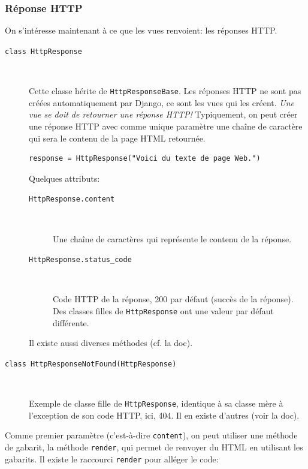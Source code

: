 \documentclass[a4paper, 10pt]{article}
\begin{document}
{\subsubsection{Réponse HTTP}
On  s'intéresse maintenant à ce que les vues renvoient: les réponses HTTP.

\begin{description}
    \item[\texttt{class HttpResponse}]~

    Cette classe hérite de \texttt{HttpResponseBase}. Les réponses HTTP ne sont pas créées automatiquement par Django, ce sont les vues qui les créent. \emph{Une vue se doit de retourner une réponse HTTP!} Typiquement, on peut créer une réponse HTTP avec comme unique paramètre une chaîne de caractère qui sera le contenu de la page HTML retournée.

    \begin{verbatim}
response = HttpResponse("Voici du texte de page Web.")
    \end{verbatim}

    Quelques attributs:

    \begin{description}
        \item[\texttt{HttpResponse.content}]~

        Une chaîne de caractères qui représente le contenu de la réponse.

        \item[\texttt{HttpResponse.status_code}]~

        Code HTTP de la réponse, 200 par défaut (succès de la réponse). Des classes filles de \texttt{HttpResponse} ont une valeur par défaut différente.
    \end{description}

    Il existe aussi diverses méthodes (cf. la doc).

    \item[\texttt{class HttpResponseNotFound(HttpResponse)}]~

    Exemple de classe fille de \texttt{HttpResponse}, identique à sa classe mère à l'exception de son code HTTP, ici, 404. Il en existe d'autres (voir la doc).
\end{description}

Comme  premier paramètre (c'est-à-dire \texttt{content}), on peut utiliser une méthode de gabarit, la méthode \texttt{render}, qui permet de renvoyer du HTML en utilisant les gabarits. Il existe le raccourci \texttt{render} pour alléger le code:

}
\end{document}
